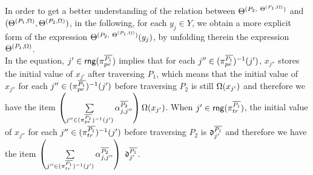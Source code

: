 In order to get a better understanding of the relation between $\Theta^{(P_2,\ \Theta^{(P_1,\Omega)})}$ and $(\Theta^{(P_1, \Omega)},\Theta^{(P_2, \Omega)})$, in the following, for each $y_j \in Y$, we obtain a more explicit form of the expression $\sumf^{(P_2,\ \sumf^{(P_1,\initval)})}(y_j)$, by unfolding therein the expression $\Theta^{(P_1,\Omega)}$\medskip.
\medskip\\
In the equation, $j' \in  \mathsf{rng}(\pi^{\overline{P_1}}_{pe})$ implies that for each $j'' \in  (\pi^{\overline{P_1}}_{pe})^{-1}(j')$,  $x_{j''}$ stores the initial value of $x_{j'}$ after traversing $P_1$, which means that the initial value of $x_{j''}$ for each $j'' \in  (\pi^{\overline{P_1}}_{pe})^{-1}(j')$ before traversing $P_2$ is still $\Omega(x_{j'})$ and therefore we have the item $\left( \sum \limits_{j'' \in (\pi^{\overline{P_1}}_{pe})^{-1}(j')} \alpha^{\overline{P_2}}_{j,j''} \right) \Omega(x_{j'})$. When $j' \in \mathsf{rng}(\pi^{\overline{P_1}}_{tr})$, the initial value of $x_{j''}$ for each $j'' \in (\pi^{\overline{P_1}}_{tr})^{-1}(j')$ before traversing $P_2$ is $\mathfrak{d}^{\overline{P_1}}_{j'}$ and therefore we have the item $\left(\sum \limits_{j'' \in (\pi^{\circled{P_1}}_{tr})^{-1}(j')} \csta^{\circled{P_2}}_{j,j''} \right)\ \vard^{\circled{P_1}}_{j'}$.
